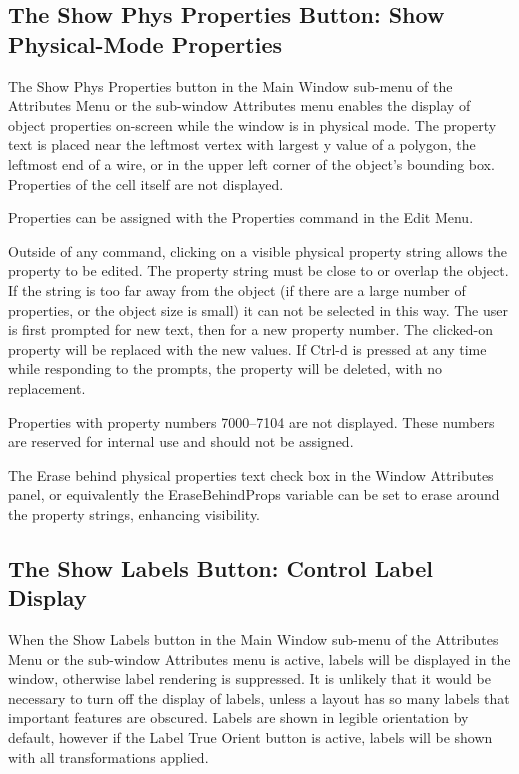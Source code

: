 \subsection{The {\cb Show Phys Properties} Button: Show Physical-Mode
 Properties}
\label{xicprops}
The {\cb Show Phys Properties} button in the {\cb Main Window}
sub-menu of the {\cb Attributes Menu} or the sub-window {\cb
Attributes} menu enables the display of object properties on-screen
while the window is in physical mode.  The property text is placed
near the leftmost vertex with largest y value of a polygon, the
leftmost end of a wire, or in the upper left corner of the object's
bounding box.  Properties of the cell itself are not displayed.

Properties can be assigned with the {\cb Properties} command in the
{\cb Edit Menu}.

Outside of any command, clicking on a visible physical property string
allows the property to be edited.  The property string must be close
to or overlap the object.  If the string is too far away from the
object (if there are a large number of properties, or the object size
is small) it can not be selected in this way.  The user is first
prompted for new text, then for a new property number.  The clicked-on
property will be replaced with the new values.  If {\kb Ctrl-d} is
pressed at any time while responding to the prompts, the property will
be deleted, with no replacement.

Properties with property numbers 7000--7104 are not displayed.  These
numbers are reserved for internal use and should not be assigned.

The {\cb Erase behind physical properties text} check box in the {\cb
Window Attributes} panel, or equivalently the {\et EraseBehindProps}
variable can be set to erase around the property strings, enhancing
visibility.


\subsection{The {\cb Show Labels} Button: Control Label Display}
When the {\cb Show Labels} button in the {\cb Main Window} sub-menu of
the {\cb Attributes Menu} or the sub-window {\cb Attributes} menu is
active, labels will be displayed in the window, otherwise label
rendering is suppressed.  It is unlikely that it would be necessary to
turn off the display of labels, unless a layout has so many labels
that important features are obscured.  Labels are shown in legible
orientation by default, however if the {\cb Label True Orient} button
is active, labels will be shown with all transformations applied.


